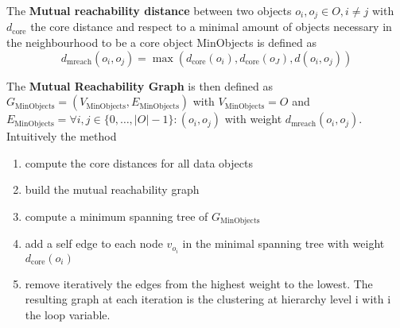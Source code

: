 The \textbf{Mutual reachability distance} between two objects $o_i, o_j \in O, i \neq j$ with $d_{\text{core}}$ the core distance and respect to a minimal amount of objects necessary in the neighbourhood to be a core object MinObjects is defined as \[ d_{\text{mreach}}(o_i, o_j) = \max(d_{\text{core}}(o_i), d_{\text{core}}(o_J), d(o_i, o_j)) \]

The \textbf{Mutual Reachability Graph} is then defined as $G_{\text{MinObjects}} = (V_{\text{MinObjects}}, E_{\text{MinObjects}})$ with $V_{\text{MinObjects}} = O$ and $E_{\text{MinObjects}} = \forall i, j \in \{0, \dots, |O| - 1\}: (o_i, o_j) $ with weight $d_{\text{mreach}}(o_i, o_j)$.\\

Intuitively the method
\begin{enumerate}
\item compute the core distances for all data objects
    \item build the mutual reachability graph
    \item compute a minimum spanning tree of $G_{\text{MinObjects}}$
    \item add a self edge to each node $v_{o_i}$ in the minimal spanning tree with weight $d_{\text{core}}(o_i)$
    \item remove iteratively the edges from the highest weight to the lowest. The resulting graph at each iteration is the clustering at hierarchy level i with i the loop variable.
\end{enumerate}


